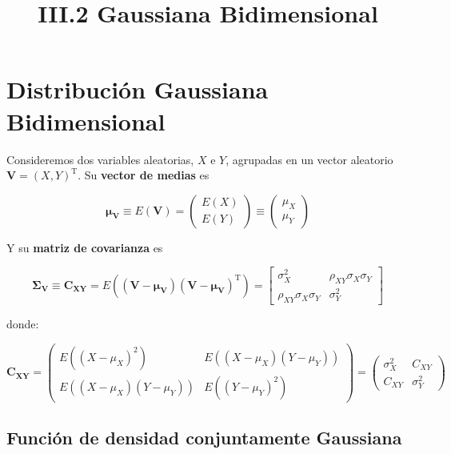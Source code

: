 \documentclass[11pt]{article}
\title{III.2 Gaussiana Bidimensional}
\begin{document}
    
    
    \maketitle
    
    

    
    \hypertarget{distribuciuxf3n-gaussiana-bidimensional}{%
\section{Distribución Gaussiana
Bidimensional}\label{distribuciuxf3n-gaussiana-bidimensional}}

Consideremos dos variables aleatorias, \(X\) e \(Y\), agrupadas en un
vector aleatorio \(\mathbf{V} = (X, Y)^\mathrm{T}\). Su \textbf{vector
de medias} es

\[
\boldsymbol{\mu_V}\equiv E(\mathbf{V}) = \left( \begin{array}{c}{E(X)} \\ {E(Y)}\end{array}\right) \equiv \left( \begin{array}{c}{\mu_{X}} \\ {\mu_{Y}}\end{array}\right)
\]

Y su \textbf{matriz de covarianza} es

\[
\boldsymbol{\Sigma_V}\equiv\mathbf{C_{XY}} = 
E\left((\mathbf{V}-\boldsymbol{\mu_V})(\mathbf{V}-\boldsymbol{\mu_V})^\mathrm{T} \right) =
\left[ \begin{array}{cc}{\sigma_{X}^{2}} & {\rho_{XY} \sigma_{X} \sigma_{Y}} \\ {\rho_{XY} \sigma_{X} \sigma_{Y}} & {\sigma_{Y}^{2}}\end{array}\right]
\]

donde:

\[\mathbf{C_{XY}} = 
\begin{pmatrix}
E((X-\mu_X)^2) & E((X-\mu_X)(Y-\mu_Y))\\
E((X-\mu_X)(Y-\mu_Y)) & E((Y-\mu_Y)^2) 
\end{pmatrix} = \begin{pmatrix}
\sigma_X^2 & C_{XY}\\
C_{XY} & \sigma_Y^2
\end{pmatrix}
\]

    \hypertarget{funciuxf3n-de-densidad-conjuntamente-gaussiana}{%
\subsection{Función de densidad conjuntamente
Gaussiana}\label{funciuxf3n-de-densidad-conjuntamente-gaussiana}}
\end{document}
